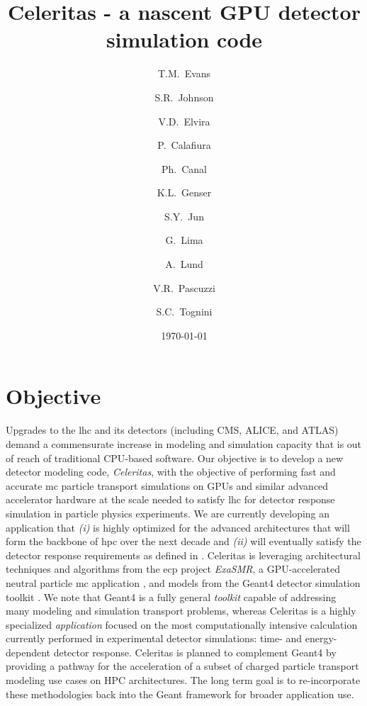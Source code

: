 \documentclass[10pt]{article}
\author[1]{T.M.~Evans}
\author[1]{S.R.~Johnson}
\author[2]{V.D.~Elvira}
\author[3]{P.~Calafiura}
\author[2]{Ph.~Canal}
\author[2]{K.L.~Genser}
\author[2]{S.Y.~Jun}
\author[2]{G.~Lima}
\author[4]{A.~Lund}
\author[3]{V.R.~Pascuzzi}
\author[1]{S.C.~Tognini}
\affil[1]{Oak Ridge National Laboratory}
\affil[2]{Fermi National Accelerator Laboratory}
\affil[3]{Lawrence Berkeley National Laboratory}
\affil[4]{Argonne National Laboratory}
\title{Celeritas - a nascent GPU detector simulation code}
\date{\today}
\begin{document}
\maketitle

\section*{Objective}

Upgrades to the \ac{lhc} and its detectors (including CMS, ALICE, and ATLAS)
demand a commensurate increase in modeling and simulation capacity that is out
of reach of traditional CPU-based software. Our objective is to develop a new
detector modeling code, \emph{Celeritas}, with the objective of performing fast
and accurate \ac{mc} particle transport simulations on GPUs and similar advanced
accelerator hardware at the scale needed to satisfy \ac{lhc} for detector
response simulation in particle physics experiments. We are currently developing
an application that \textsl{(i)} is highly optimized for the advanced
architectures that will form the backbone of \ac{hpc} over the next decade and
\textsl{(ii)} will eventually satisfy the detector response requirements as
defined in
\cite{the_hep_software_foundation_roadmap_2019}. Celeritas is leveraging
architectural techniques and algorithms from the \ac{ecp} project \emph{ExaSMR},
a GPU-accelerated neutral particle \ac{mc} application \cite{ecp2019}, and
models from the Geant4 detector simulation toolkit \cite{geant4}. We note that
Geant4 is a fully general \emph{toolkit} capable of addressing many modeling and
simulation transport problems, whereas Celeritas is a highly specialized
\emph{application} focused on the most computationally intensive calculation
currently performed in experimental detector simulations: time- and
energy-dependent detector response.  Celeritas is planned to complement Geant4
by providing a pathway for the acceleration of a subset of charged particle
transport modeling use cases on HPC architectures. The long term goal is to
re-incorporate these methodologies back into the Geant framework for broader
application use.


\end{document}
